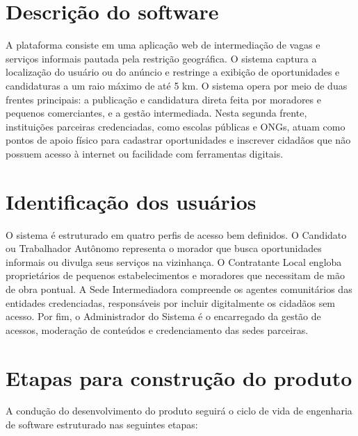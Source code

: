 \documentclass[
    12pt,
    oneside,
    a4paper,
    brazil
]{abntex2}
\begin{document}
\section{Descrição do software}
A plataforma consiste em uma aplicação web de intermediação de vagas e serviços informais pautada pela restrição geográfica. O sistema captura a localização do usuário ou do anúncio e restringe a exibição de oportunidades e candidaturas a um raio máximo de até 5 km. O sistema opera por meio de duas frentes principais: a publicação e candidatura direta feita por moradores e pequenos comerciantes, e a gestão intermediada. Nesta segunda frente, instituições parceiras credenciadas, como escolas públicas e ONGs, atuam como pontos de apoio físico para cadastrar oportunidades e inscrever cidadãos que não possuem acesso à internet ou facilidade com ferramentas digitais.

\section{Identificação dos usuários}
O sistema é estruturado em quatro perfis de acesso bem definidos. O Candidato ou Trabalhador Autônomo representa o morador que busca oportunidades informais ou divulga seus serviços na vizinhança. O Contratante Local engloba proprietários de pequenos estabelecimentos e moradores que necessitam de mão de obra pontual. A Sede Intermediadora compreende os agentes comunitários das entidades credenciadas, responsáveis por incluir digitalmente os cidadãos sem acesso. Por fim, o Administrador do Sistema é o encarregado da gestão de acessos, moderação de conteúdos e credenciamento das sedes parceiras.

\section{Etapas para construção do produto}
A condução do desenvolvimento do produto seguirá o ciclo de vida de engenharia de software estruturado nas seguintes etapas:
\end{document}
